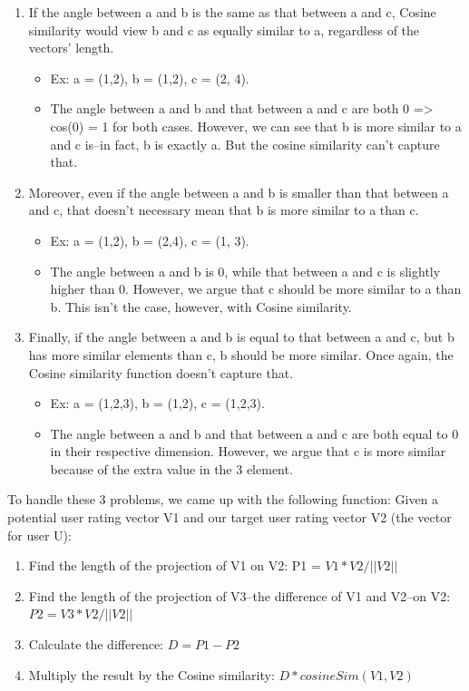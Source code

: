 \documentclass{article}
\begin{document}
\begin{enumerate}
    \item If the angle between a and b is the same as that between a and c, Cosine similarity would view b and c as equally similar to a, regardless of the vectors' length.
    \begin{itemize}
        \item Ex: a = (1,2), b = (1,2), c = (2, 4).
        \item The angle between a and b and that between a and c are both 0 => cos(0) = 1 for both cases. However, we can see that b is more similar to a and c is--in fact, b is exactly a. But the cosine similarity can't capture that.
    \end{itemize}
    
    \item Moreover, even if the angle between a and b is smaller than that between a and c, that doesn't necessary mean that b is more similar to a than c.
    \begin{itemize}
        \item Ex: a = (1,2), b = (2,4), c = (1, 3).
        \item The angle between a and b is 0, while that between a and c is slightly higher than 0. However, we argue that c should be more similar to a than b. This isn't the case, however, with Cosine similarity.
    \end{itemize}
    
    \item Finally, if the angle between a and b is equal to that between a and c, but b has more similar elements than c, b should be more similar. Once again, the Cosine similarity function doesn't capture that.
    \begin{itemize}
        \item Ex: a = (1,2,3), b = (1,2), c = (1,2,3).
        \item The angle between a and b and that between a and c are both equal to 0 in their respective dimension. However, we argue that c is more similar because of the extra value in the 3 element.
    \end{itemize}
\end{enumerate}

To handle these 3 problems, we came up with the following function: Given a potential user rating vector V1 and our target user rating vector V2 (the vector for user U):

\begin{enumerate}
    \item Find the length of the projection of V1 on V2: P1 = $V1 * V2 / \vert \vert V2 \vert \vert$
    
    \item Find the length of the projection of V3--the difference of V1 and V2--on V2: $P2 = V3 * V2 / \vert \vert V2 \vert \vert$
    
    \item Calculate the difference: $D = P1 - P2$
    
    \item Multiply the result by the Cosine similarity: $D * cosineSim(V1, V2)$
\end{enumerate}
\end{document}
